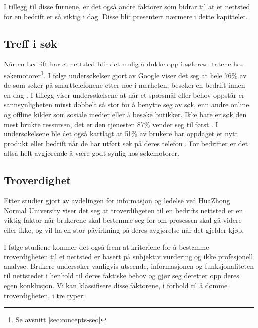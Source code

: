I tillegg til disse funnene, er det også andre faktorer som bidrar til at et nettsted for en bedrift er så viktig i dag. Disse blir presentert nærmere i dette kapittelet. 

\subsection{Treff i søk}
Når en bedrift har et nettsted blir det mulig å dukke opp i søkeresultatene hos søkemotorer\footnote{Se avsnitt \ref{sec:concepts-seo}}. I følge undersøkelser gjort av Google viser det seg at hele 76\% av de som søker på smarttelefonene etter noe i nærheten, besøker en bedrift innen en dag \cite{google16hms}. I tillegg viser undersøkelsene at når et spørsmål eller behov oppstår er sannsynligheten minst dobbelt så stor for å benytte seg av søk, enn andre online og offline kilder som sosiale medier eller å besøke butikker. Ikke bare er søk den mest brukte ressursen, det er den tjenesten 87\% vender seg til først \cite{google16mhc}. I undersøkelsene ble det også kartlagt at 51\% av brukere har oppdaget et nytt produkt eller bedrift når de har utført søk på deres telefon \cite{google16scp}. For bedrifter er det altså helt avgjørende å være godt synlig hos søkemotorer.




\subsection{Troverdighet}
Etter studier gjort av avdelingen for informasjon og ledelse ved HuaZhong Normal University viser det seg at troverdihgeten til en bedrifts nettsted er en viktig faktor når brukerene skal bestemme seg for om prosessen skal gå videre eller ikke, og vil ha en stor påvirkning på deres avgjørelse når det gjelder kjøp.



I følge studiene kommer det også frem at kriteriene for å bestemme troverdigheten til et nettsted er basert på subjektiv vurdering og ikke profesjonell analyse. Brukere undersøker vanligvis utseende, informasjonen og funksjonaliteten til nettstedet i henhold til deres faktiske behov og gjør seg deretter opp deres egen konklusjon. Vi kan klassifisere disse faktorene, i forhold til å dømme troverdigheten, i tre typer: 

